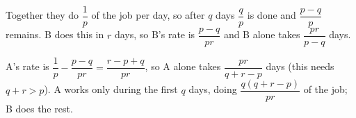 Together they do $\dfrac1p$ of the job per day, so after $q$ days $\dfrac qp$ is done and $\dfrac{p-q}p$ remains. B does this in $r$ days, so B's rate is $\dfrac{p-q}{pr}$ and B alone takes $\boxed{\dfrac{pr}{p-q}}$ days.

A's rate is $\dfrac1p-\dfrac{p-q}{pr}=\dfrac{r-p+q}{pr}$, so A alone takes $\boxed{\dfrac{pr}{q+r-p}}$ days (this needs $q+r>p$). A works only during the first $q$ days, doing $\boxed{\dfrac{q(q+r-p)}{pr}}$ of the job; B does the rest.
